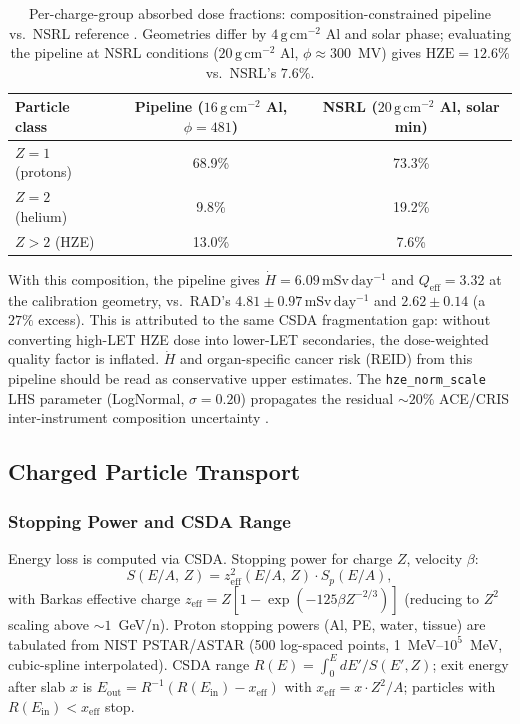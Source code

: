 \documentclass[a4paper,fleqn]{cas-sc}
\newcommand{\gcm}{\,\mathrm{g\,cm^{-2}}}
\newcommand{\mSvday}{\,\mathrm{mSv\,day^{-1}}}
\newcommand{\Qeff}{Q_\mathrm{eff}}
\newcommand{\code}[1]{\texttt{#1}}
\begin{document}
\begin{table}[t]
  \centering
  \small
  \caption{Per-charge-group absorbed dose fractions: composition-constrained
           pipeline vs.\ NSRL reference \citep{slaba2016}. Geometries differ
           by $4\gcm$ Al and solar phase; evaluating the pipeline at NSRL
           conditions ($20\gcm$ Al, $\phi\approx300$~MV) gives
           $\mathrm{HZE}=12.6\%$ vs.\ NSRL's $7.6\%$.}
  \label{tab:species_compare}
  \begin{tabular*}{\tblwidth}{@{}LCC@{}}
    \toprule
    Particle class & Pipeline ($16\gcm$ Al, $\phi=481$) & NSRL ($20\gcm$ Al, solar min) \\
    \midrule
    $Z=1$ (protons)  & 68.9\% & 73.3\% \\
    $Z=2$ (helium)   &  9.8\% & 19.2\% \\
    $Z>2$ (HZE)      & 13.0\% &  7.6\% \\
    \bottomrule
  \end{tabular*}
\end{table}

With this composition, the pipeline gives $\dot{H}=6.09\mSvday$ and
$\Qeff=3.32$ at the calibration geometry, vs.\ RAD's $4.81\pm0.97\mSvday$
and $2.62\pm0.14$ (a $27\%$ excess). This is attributed to the same CSDA
fragmentation gap: without converting high-LET HZE dose into lower-LET
secondaries, the dose-weighted quality factor is inflated. $\dot{H}$ and
organ-specific cancer risk (REID) from this pipeline should be read as
conservative upper estimates.
The \code{hze\_norm\_scale} LHS parameter (LogNormal, $\sigma=0.20$)
propagates the residual $\sim\!20\%$ ACE/CRIS inter-instrument composition
uncertainty \citep{george2009, boschini2020}.

\subsection{Charged Particle Transport}

\subsubsection{Stopping Power and CSDA Range}

Energy loss is computed via CSDA. Stopping power for charge $Z$, velocity
$\beta$:
\begin{equation}
  S(E/A,\, Z) = z_\mathrm{eff}^2(E/A,\, Z) \cdot S_p(E/A),
\end{equation}
with Barkas effective charge \citep{barkas1963}
$z_\mathrm{eff} = Z[1-\exp(-125\beta Z^{-2/3})]$ (reducing to $Z^2$ scaling
above $\sim\!1$~GeV/n). Proton stopping powers (Al, PE, water, tissue) are
tabulated from NIST PSTAR/ASTAR (500 log-spaced points, 1~MeV--$10^5$~MeV,
cubic-spline interpolated). CSDA range $R(E)=\int_0^E dE'/S(E',Z)$; exit
energy after slab $x$ is $E_\mathrm{out}=R^{-1}(R(E_\mathrm{in})-x_\mathrm{eff})$
with $x_\mathrm{eff}=x\cdot Z^2/A$; particles with $R(E_\mathrm{in})<x_\mathrm{eff}$ stop.
\end{document}
